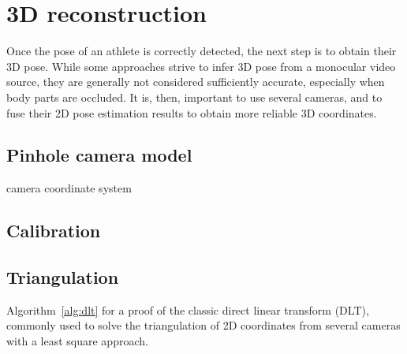 \FloatBarrier
\section{3D reconstruction}\label{sec:3D reconstruction}
\label{ch:2.2}

Once the pose of an athlete is correctly detected, the next step is to obtain their 3D pose. While some approaches strive to infer 3D pose from a monocular video source, they are generally not considered sufficiently accurate, especially when body parts are occluded. It is, then, important to use several cameras, and to fuse their 2D pose estimation results to obtain more reliable 3D coordinates.


\subsection{Pinhole camera model}\label{subsec:Pinhole model}

camera coordinate system






\subsection{Calibration}

\cite{Marchand2015}


\subsection{Triangulation}\label{triangulation}

Algorithm~\ref{alg:dlt} for a proof of the classic direct linear transform (DLT), commonly used to solve the triangulation of 2D coordinates from several cameras with a least square approach.



